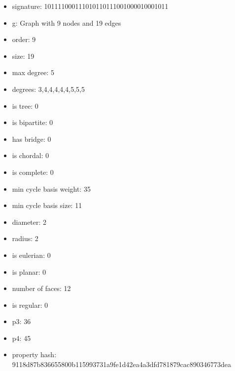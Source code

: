 \newpage
\begin{figure}
\end{figure}
\begin{itemize}
\item signature: 101111000111010110111001000010001011
\item g: Graph with 9 nodes and 19 edges
\item order: 9
\item size: 19
\item max degree: 5
\item degrees: 3,4,4,4,4,4,5,5,5
\item is tree: 0
\item is bipartite: 0
\item has bridge: 0
\item is chordal: 0
\item is complete: 0
\item min cycle basis weight: 35
\item min cycle basis size: 11
\item diameter: 2
\item radius: 2
\item is eulerian: 0
\item is planar: 0
\item number of faces: 12
\item is regular: 0
\item p3: 36
\item p4: 45
\item property hash: 9118d87b836655800b115993731a9fe1d42ea4a3dfd781879cac890346773dea
\end{itemize}
